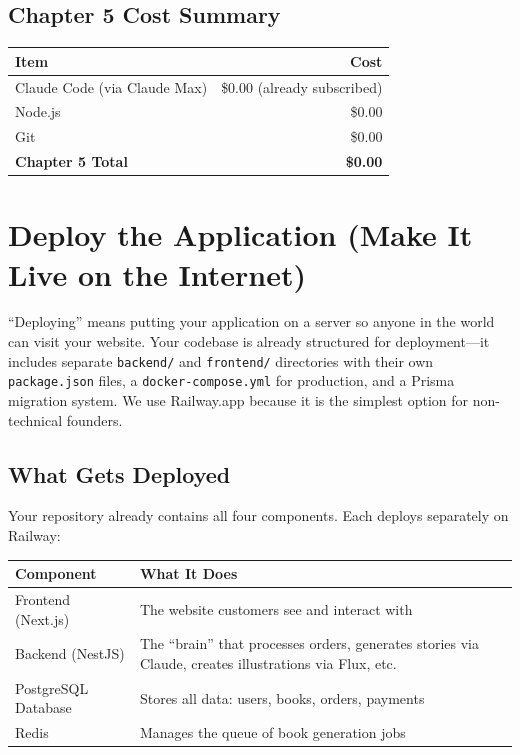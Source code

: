 \documentclass[12pt, letterpaper, oneside]{book}
\begin{document}
\section{Chapter 5 Cost Summary}

\begin{table}[H]
\centering
\begin{tabular}{lr}
\toprule
\textbf{Item} & \textbf{Cost} \\
\midrule
Claude Code (via Claude Max) & \$0.00 (already subscribed) \\
Node.js & \$0.00 \\
Git & \$0.00 \\
\midrule
\textbf{Chapter 5 Total} & \textbf{\$0.00} \\
\bottomrule
\end{tabular}
\end{table}


\chapter{Deploy the Application (Make It Live on the Internet)}

``Deploying'' means putting your application on a server so anyone in the world can visit your website. Your codebase is already structured for deployment---it includes separate \texttt{backend/} and \texttt{frontend/} directories with their own \texttt{package.json} files, a \texttt{docker-compose.yml} for production, and a Prisma migration system. We use Railway.app because it is the simplest option for non-technical founders.

\section{What Gets Deployed}

Your repository already contains all four components. Each deploys separately on Railway:

\begin{table}[H]
\centering
\begin{tabularx}{\textwidth}{lX}
\toprule
\textbf{Component} & \textbf{What It Does} \\
\midrule
Frontend (Next.js) & The website customers see and interact with \\
Backend (NestJS) & The ``brain'' that processes orders, generates stories via Claude, creates illustrations via Flux, etc. \\
PostgreSQL Database & Stores all data: users, books, orders, payments \\
Redis & Manages the queue of book generation jobs \\
\bottomrule
\end{tabularx}
\end{table}
\end{document}
